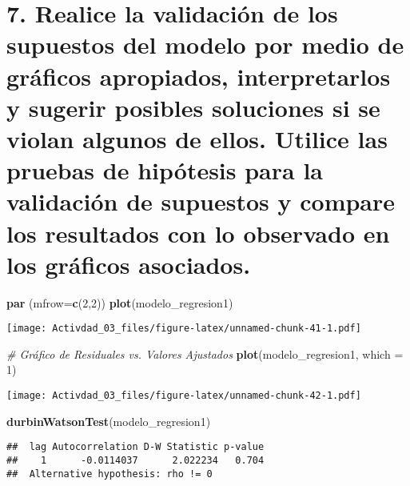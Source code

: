 \documentclass[
]{article}
\newenvironment{Shaded}{\begin{snugshade}}{\end{snugshade}}
\newcommand{\AttributeTok}[1]{\textcolor[rgb]{0.13,0.29,0.53}{#1}}
\newcommand{\CommentTok}[1]{\textcolor[rgb]{0.56,0.35,0.01}{\textit{#1}}}
\newcommand{\DecValTok}[1]{\textcolor[rgb]{0.00,0.00,0.81}{#1}}
\newcommand{\FunctionTok}[1]{\textcolor[rgb]{0.13,0.29,0.53}{\textbf{#1}}}
\newcommand{\NormalTok}[1]{#1}
\begin{document}
\section{\texorpdfstring{\textbf{7. Realice la validación de los
supuestos del modelo por medio de gráficos apropiados, interpretarlos y
sugerir posibles soluciones si se violan algunos de ellos. Utilice las
pruebas de hipótesis para la validación de supuestos y compare los
resultados con lo observado en los gráficos
asociados.}}{7. Realice la validación de los supuestos del modelo por medio de gráficos apropiados, interpretarlos y sugerir posibles soluciones si se violan algunos de ellos. Utilice las pruebas de hipótesis para la validación de supuestos y compare los resultados con lo observado en los gráficos asociados.}}\label{realice-la-validaciuxf3n-de-los-supuestos-del-modelo-por-medio-de-gruxe1ficos-apropiados-interpretarlos-y-sugerir-posibles-soluciones-si-se-violan-algunos-de-ellos.-utilice-las-pruebas-de-hipuxf3tesis-para-la-validaciuxf3n-de-supuestos-y-compare-los-resultados-con-lo-observado-en-los-gruxe1ficos-asociados.}

\begin{Shaded}
\begin{Highlighting}[]
\FunctionTok{par}\NormalTok{ (}\AttributeTok{mfrow=}\FunctionTok{c}\NormalTok{(}\DecValTok{2}\NormalTok{,}\DecValTok{2}\NormalTok{))}
\FunctionTok{plot}\NormalTok{(modelo\_regresion1)}
\end{Highlighting}
\end{Shaded}

\texttt{[image: Activdad\_03\_files/figure-latex/unnamed-chunk-41-1.pdf]}

\begin{Shaded}
\begin{Highlighting}[]
\CommentTok{\# Gráfico de Residuales vs. Valores Ajustados}
\FunctionTok{plot}\NormalTok{(modelo\_regresion1, }\AttributeTok{which =} \DecValTok{1}\NormalTok{)}
\end{Highlighting}
\end{Shaded}

\texttt{[image: Activdad\_03\_files/figure-latex/unnamed-chunk-42-1.pdf]}

\begin{Shaded}
\begin{Highlighting}[]
\FunctionTok{durbinWatsonTest}\NormalTok{(modelo\_regresion1)}
\end{Highlighting}
\end{Shaded}

\begin{verbatim}
##  lag Autocorrelation D-W Statistic p-value
##    1      -0.0114037      2.022234   0.704
##  Alternative hypothesis: rho != 0
\end{verbatim}
\end{document}
